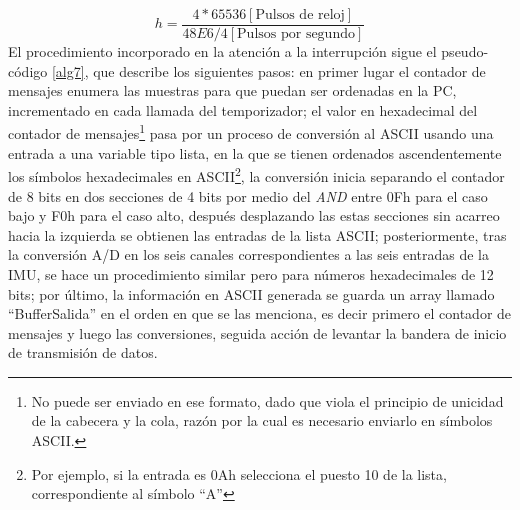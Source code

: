 \documentclass[10pt]{report}
\numberwithin{equation}{chapter}
\numberwithin{algorithm}{chapter}
\begin{document}
$$h=\frac{4*65536[\text{Pulsos de reloj}]}{48E6/4[\text{Pulsos por segundo}]}$$
El procedimiento incorporado en la atención a la interrupción sigue el pseudo-código \ref{alg7}, que describe los siguientes pasos: en primer lugar el contador de mensajes enumera las muestras para que puedan ser ordenadas en la PC, incrementado en cada llamada del temporizador; el valor en hexadecimal del contador de mensajes\footnote{No puede ser enviado en ese formato, dado que viola el principio de unicidad de la cabecera y la cola, razón por la cual es necesario enviarlo en símbolos ASCII.} pasa por un proceso de conversión al ASCII usando una entrada a una variable tipo lista, en la que se tienen ordenados ascendentemente los símbolos hexadecimales en ASCII\footnote{Por ejemplo, si la entrada es 0Ah selecciona el puesto 10 de la lista, correspondiente al símbolo “A”}, la conversión inicia separando el contador de 8 bits en dos secciones de 4 bits por medio del \emph{AND} entre 0Fh para el caso bajo y F0h para el caso alto, después desplazando las estas secciones sin acarreo hacia la izquierda se obtienen las entradas de la lista ASCII; posteriormente, tras la conversión A/D en los seis canales correspondientes a las seis entradas de la IMU, se hace un procedimiento similar pero para números hexadecimales de 12 bits; por último, la información en ASCII generada se guarda un array llamado “BufferSalida” en el orden en que se las menciona, es decir primero el contador de mensajes y luego las conversiones, seguida acción de levantar la bandera de inicio de transmisión de datos.\par
\begin{algorithm}[ht]
\caption{Interrupción del temporizador 1 $\mu$CA}
\label{alg5}
\end{algorithm}
\end{document}
